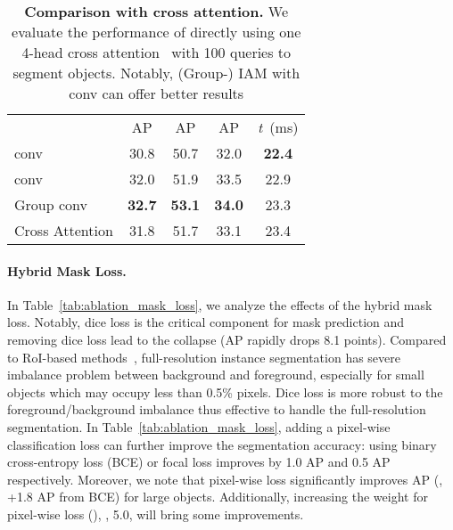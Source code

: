 \documentclass[10pt,twocolumn,letterpaper]{article}
\newcommand{\tb}[1]{\textbf{#1}}
\newcommand{\aps}{AP & AP & AP}
\newcommand{\tline}{\Xhline{1pt}}
\begin{document}
\begin{table*}
\begin{minipage}[t]{0.310\linewidth}
{\begin{tabular}{l|ccc|c}
 & \aps & \textit{t}~(ms)\\
    \tline
     conv & 30.8 & 50.7 & 32.0 & \tb{22.4} \\
     conv & 32.0 & 51.9 & 33.5 & 22.9 \\
    Group  conv & \tb{32.7} & \tb{53.1} & \tb{34.0} & 23.3 \\
    \hline
    Cross Attention & 31.8 & 51.7 & 33.1 & 23.4 \\
\end{tabular}}
    \caption{\textbf{Comparison with cross attention.} 
    We evaluate the performance of directly using one 4-head cross attention~\cite{DETRCarionMSUKZ20} with 100 queries to segment objects. Notably, (Group-) IAM with  conv can offer better results}
    \label{tab:ablation_cross_attention}
\end{minipage}
\vspace{-8pt}
\end{table*}

\paragraph{Hybrid Mask Loss.}
In Table~\ref{tab:ablation_mask_loss}, we analyze the effects of the hybrid mask loss.
Notably, dice loss is the critical component for mask prediction and removing dice loss lead to the collapse (AP rapidly drops 8.1 points).
Compared to RoI-based methods~\cite{MaskRCNNHeGDG17}, full-resolution instance segmentation has severe imbalance problem between background and foreground, especially for small objects which may occupy less than 0.5\% pixels.
Dice loss is more robust to the foreground/background imbalance thus effective to handle the full-resolution segmentation.
In Table~\ref{tab:ablation_mask_loss}, adding a pixel-wise classification loss can further improve the segmentation accuracy: using binary cross-entropy loss (BCE) or focal loss improves by 1.0 AP and 0.5 AP respectively. 
Moreover, we note that pixel-wise loss significantly improves AP (\eg, +1.8 AP from BCE) for large objects.
Additionally, increasing the weight for pixel-wise loss (), \eg, 5.0, will bring some improvements.
\end{document}
